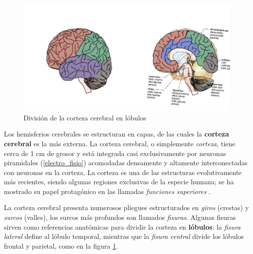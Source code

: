 \begin{figure}
\centering
\includegraphics[width=\linewidth]{./img_diagramas/cerebro_zonas.pdf} 
\caption{División de la corteza cerebral en lóbulos}
\label{lobulos}
\end{figure}

Los hemisferios cerebrales se estructuran en capas, de las cuales la \textbf{corteza cerebral} es
la más externa. La corteza cerebral, o simplemente \textit{corteza}, tiene cerca de 1 cm de grosor 
y está integrada casi exclusivamente por neuronas piramidales (\ref{electro_fisio}) acomodadas 
densamente y altamente interconectadas con neuronas en la corteza. 
La corteza es una de las estructuras evolutivamente más recientes, siendo algunas regiones 
exclusivas de la especie humana; se ha mostrado su papel protagónico en 
las llamadas \textit{funciones superiores} \cite{Clark98_2}.

La corteza cerebral presenta numerosos pliegues estructurados en \textit{giros} (crestas) y
\textit{surcos} (valles), los surcos más profundos son llamados \textit{fisuras}. Algunas 
fisuras sirven como referencias anatómicas para dividir la corteza en \textbf{lóbulos}:
la \textit{fisura lateral} define al lóbulo temporal, mientras que la \textit{fisura central} divide 
los lóbulos frontal y parietal, como en la figura \ref{lobulos}.



